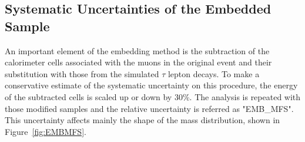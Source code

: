

%


\subsection{Systematic Uncertainties of the \Ztautau Embedded Sample}\label{sec:embsys}

An important element of the embedding method is the subtraction of the 
calorimeter cells associated with the muons in the original \Zmumu event and their substitution with those from the simulated $\tau$ lepton
decays. To make a conservative estimate of the systematic uncertainty on this procedure, 
the energy of the subtracted cells is scaled up or down by 30\%. The analysis is repeated with those modified 
samples and the relative uncertainty is referred as "EMB\_MFS". This uncertainty affects mainly the shape of the \mmc mass 
distribution, shown in Figure~\ref{fig:EMBMFS}.


